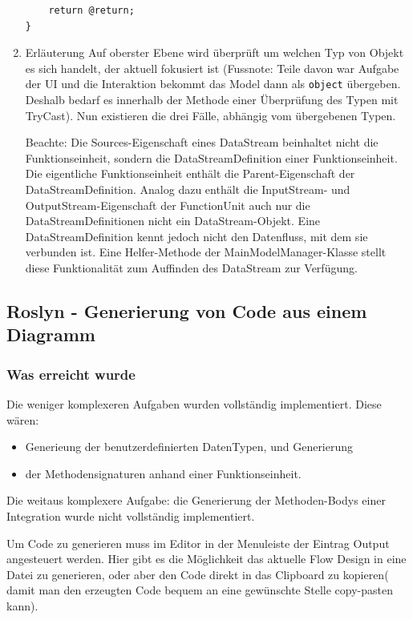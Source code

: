 \documentclass[11pt]{article}
\begin{document}
\begin{enumerate}
\begin{verbatim}
    return @return;
}
\end{verbatim}


\item Erläuterung
\label{sec:orgheadline30}
Auf oberster Ebene wird überprüft um welchen Typ von Objekt es sich
handelt, der aktuell fokusiert ist (Fussnote: Teile davon war Aufgabe der UI und die
Interaktion bekommt das Model dann als \texttt{object} übergeben. Deshalb bedarf es
innerhalb der Methode einer Überprüfung des Typen mit TryCast). Nun
existieren die drei Fälle, abhängig vom übergebenen Typen.

Beachte: Die Sources-Eigenschaft eines DataStream beinhaltet nicht die Funktionseinheit,
sondern die DataStreamDefinition einer Funktionseinheit. Die eigentliche
Funktionseinheit enthält die Parent-Eigenschaft der DataStreamDefinition.
Analog dazu enthält die InputStream- und OutputStream-Eigenschaft der
FunctionUnit auch nur die DataStreamDefinitionen nicht ein DataStream-Objekt.
Eine DataStreamDefinition kennt jedoch nicht den Datenfluss, mit dem sie
verbunden ist. Eine Helfer-Methode der MainModelManager-Klasse stellt
diese Funktionalität zum Auffinden des DataStream zur Verfügung.
\end{enumerate}


\subsection{Roslyn - Generierung von Code aus einem Diagramm}
\label{sec:orgheadline46}

\subsubsection{Was erreicht wurde}
\label{sec:orgheadline33}
Die weniger komplexeren Aufgaben wurden vollständig implementiert.
Diese wären: 
\begin{itemize}
\item Generieung der benutzerdefinierten DatenTypen, und Generierung
\item der Methodensignaturen anhand einer Funktionseinheit.
\end{itemize}

Die weitaus komplexere Aufgabe: die Generierung der Methoden-Bodys einer Integration wurde nicht
vollständig implementiert.

Um Code zu generieren muss im Editor in der Menuleiste der Eintrag Output
angesteuert werden.
Hier gibt es die Möglichkeit das aktuelle Flow Design in eine Datei zu
generieren, oder aber den Code direkt in das Clipboard zu kopieren( damit man den erzeugten Code bequem an
eine gewünschte Stelle copy-pasten kann).
\end{document}
